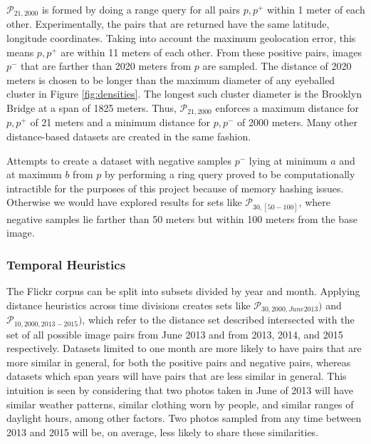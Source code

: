 $\mathcal{P}_{21, 2000}$ is formed by doing a range query for all pairs $p, p^+$ within 1 meter of each other. Experimentally, the pairs that are returned have the same latitude, longitude coordinates. Taking into account the maximum geolocation error, this means $p, p^+$ are within 11 meters of each other. From these positive pairs, images $p^-$ that are farther than 2020 meters from $p$ are sampled. The distance of 2020 meters is chosen to be longer than the maximum diameter of any eyeballed cluster in Figure \ref{fig:densities}. The longest such cluster diameter is the Brooklyn Bridge at a span of 1825 meters. Thus, $\mathcal{P}_{21,2000}$ enforces a maximum distance for $p, p^+$ of 21 meters and a minimum distance for $p, p^-$ of 2000 meters. Many other distance-based datasets are created in the same fashion.

Attempts to create a dataset with negative samples $p^-$ lying at minimum $a$ and at maximum $b$ from $p$ by performing a ring query proved to be computationally intractible for the purposes of this project because of memory hashing issues. Otherwise we would have explored results for sets like $\mathcal{P}_{30,[50-100]}$, where negative samples lie farther than 50 meters but within 100 meters from the base image.

\subsubsection{Temporal Heuristics}
The Flickr corpus can be split into subsets divided by year and month. Applying distance heuristics across time divisions creates sets like $\mathcal{P}_{30,2000,June2013})$ and $\mathcal{P}_{10,2000,2013-2015})$, which refer to the distance set described intersected with the set of all possible image pairs from June 2013 and from 2013, 2014, and 2015 respectively. Datasets limited to one month are more likely to have pairs that are more similar in general, for both the positive pairs and negative pairs, whereas datasets which span years will have pairs that are less similar in general. This intuition is seen by considering that two photos taken in June of 2013 will have similar weather patterns, similar clothing worn by people, and similar ranges of daylight hours, among other factors. Two photos sampled from any time between 2013 and 2015 will be, on average, less likely to share these similarities. 

